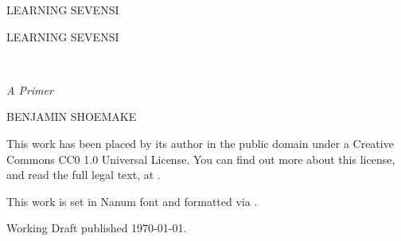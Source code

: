 \pagestyle{empty}


\begin{titlepage}

\begin{center}
\begin{large}LEARNING SEVENSI\end{large}
\end{center}

\end{titlepage}

\emptybreak


\begin{titlepage}

\noindent\begin{huge}LEARNING SEVENSI\end{huge}\\
\begin{large}\emph{A Primer}\end{large}

\medskip

\noindent BENJAMIN SHOEMAKE

\end{titlepage}

\newpage

\begin{small}

\noindent This work has been placed by its author in the public domain under a Creative Commons CC0 1.0 Universal License.
You can find out more about this license, and read the full legal text, at \linebreak[0]\linebreak[0]\linebreak[0]\linebreak[0].

\medskip

\noindent This work is set in Nanum font and formatted via \XeLaTeX.

\medskip

\noindent Working Draft published \today.

\end{small}

